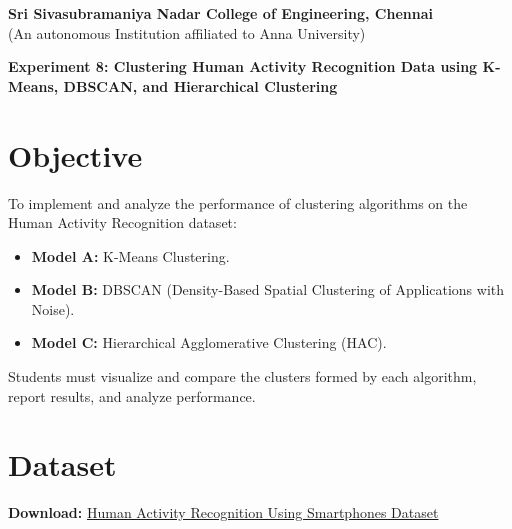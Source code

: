 \documentclass[11pt]{article}
\begin{document}
\begin{center}
    \Large \textbf{Sri Sivasubramaniya Nadar College of Engineering, Chennai} \\
    \large (An autonomous Institution affiliated to Anna University) \\
    \vspace{0.3cm}
\end{center}

\begin{table}[!h]
\renewcommand{\arraystretch}{1.5}
\centering
{}
\end{table}

\begin{center}
    \textbf{Experiment 8: Clustering Human Activity Recognition Data using K-Means, DBSCAN, and Hierarchical Clustering}
\end{center}

\section*{Objective}
To implement and analyze the performance of clustering algorithms on the Human Activity Recognition dataset:
\begin{itemize}
    \item \textbf{Model A:} K-Means Clustering.
    \item \textbf{Model B:} DBSCAN (Density-Based Spatial Clustering of Applications with Noise).
    \item \textbf{Model C:} Hierarchical Agglomerative Clustering (HAC).
\end{itemize}
Students must visualize and compare the clusters formed by each algorithm, report results, and analyze performance.

\section*{Dataset}
\textbf{Download:} \href{https://archive.ics.uci.edu/dataset/240/human+activity+recognition+using+smartphones}{Human Activity Recognition Using Smartphones Dataset}  
\end{document}
